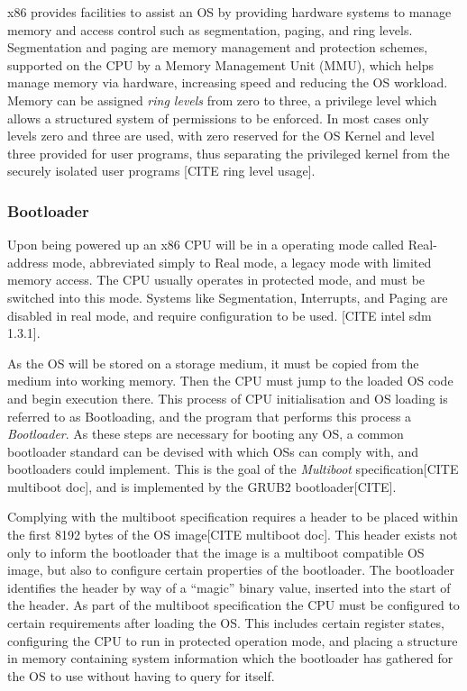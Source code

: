 \documentclass[11pt]{report}
\begin{document}
x86 provides facilities to assist an OS by providing hardware systems to manage memory and access control such as segmentation, paging, and ring levels. Segmentation and paging are memory management and protection schemes, supported on the CPU by a Memory Management Unit (MMU), which helps manage memory via hardware, increasing speed and reducing the OS workload. Memory can be assigned \textit{ring levels} from zero to three, a privilege level which allows a structured system of permissions to be enforced. In most cases only levels zero and three are used, with zero reserved for the OS Kernel and level three provided for user programs, thus separating the privileged kernel from the securely isolated user programs [CITE ring level usage].

\subsubsection{Bootloader}
Upon being powered up an x86 CPU will be in a operating mode called Real-address mode, abbreviated simply to Real mode, a legacy mode with limited memory access. The CPU usually operates in protected mode, and must be switched into this mode. Systems like Segmentation, Interrupts, and Paging are disabled in real mode, and require configuration to be used. [CITE intel sdm 1.3.1].

As the OS will be stored on a storage medium, it must be copied from the medium into working memory. Then the CPU must jump to the loaded OS code and begin execution there. This process of CPU initialisation and OS loading is referred to as Bootloading, and the program that performs this process a \textit{Bootloader}. As these steps are necessary for booting any OS, a common bootloader standard can be devised with which OSs can comply with, and bootloaders could implement. This is the goal of the \textit{Multiboot} specification[CITE multiboot doc], and is implemented by the GRUB2 bootloader[CITE].

Complying with the multiboot specification requires a header to be placed within the first 8192 bytes of the OS image[CITE multiboot doc]. This header exists not only to inform the bootloader that the image is a multiboot compatible OS image, but also to configure certain properties of the bootloader. The bootloader identifies the header by way of a ``magic'' binary value, inserted into the start of the header. As part of the multiboot specification the CPU must be configured to certain requirements after loading the OS. This includes certain register states, configuring the CPU to run in protected operation mode, and placing a structure in memory containing system information which the bootloader has gathered for the OS to use without having to query for itself.
\end{document}
